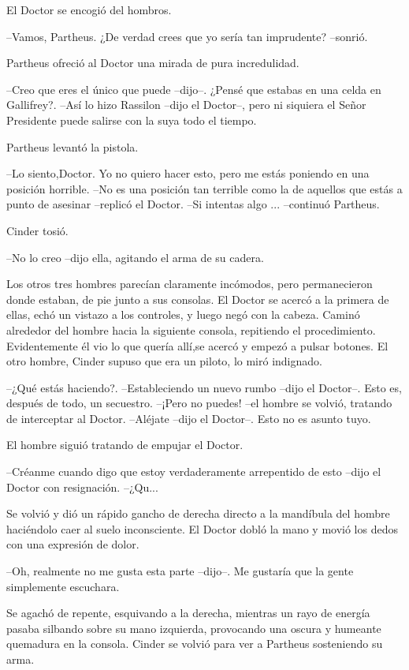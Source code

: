 El Doctor se encogió del hombros. 

--Vamos, Partheus. ¿De verdad crees que yo sería tan imprudente? --sonrió.

Partheus ofreció al Doctor una mirada de pura incredulidad. 

--Creo que eres el único que puede --dijo--. ¿Pensé que estabas en una celda en Gallifrey?.
--Así lo hizo Rassilon --dijo el Doctor--, pero ni siquiera el Señor Presidente puede salirse con la suya todo el tiempo.

Partheus levantó la pistola. 

--Lo siento,Doctor. Yo no quiero hacer esto, pero me estás poniendo en una posición horrible.
--No es una posición tan terrible como la de aquellos que estás a punto de asesinar --replicó el Doctor.
--Si intentas algo ... --continuó Partheus.

Cinder tosió. 

--No lo creo --dijo ella, agitando el arma de su cadera.

Los otros tres hombres parecían claramente incómodos, pero permanecieron donde estaban, de pie junto a sus consolas. El Doctor se acercó a la primera de ellas, echó un vistazo a los controles, y luego negó con la cabeza. Caminó alrededor del hombre hacia la siguiente consola, repitiendo el procedimiento. Evidentemente él vio lo que quería allí,se acercó y empezó a pulsar botones.
El otro hombre, Cinder supuso que era un piloto, lo miró indignado. 

--¿Qué estás haciendo?.
--Estableciendo un nuevo rumbo --dijo el Doctor--. Esto es, después de todo, un secuestro.
--¡Pero no puedes! --el hombre se volvió, tratando de interceptar al Doctor.
--Aléjate --dijo el Doctor--. Esto no es asunto tuyo.

El hombre siguió tratando de empujar el Doctor.

--Créanme cuando digo que estoy verdaderamente arrepentido de esto --dijo el Doctor con resignación.
--¿Qu...

Se volvió y dió un rápido gancho de derecha directo a la mandíbula del hombre haciéndolo caer al suelo inconsciente. El Doctor dobló la mano y movió los dedos con una expresión de dolor. 

--Oh, realmente no me gusta esta parte --dijo--. Me gustaría que la gente simplemente escuchara.

Se agachó de repente, esquivando a la derecha, mientras un rayo de energía pasaba silbando sobre su mano izquierda, provocando una oscura y humeante quemadura en la consola. Cinder se volvió para ver a Partheus sosteniendo su arma. 

